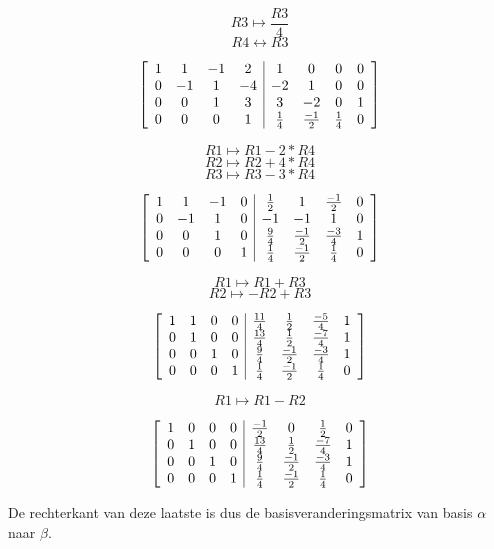 \documentclass[lineaire_algebra_oplossingen.tex]{subfiles}
\begin{document}
\[R3 \mapsto \frac{R3}{4} \]
\[R4 \leftrightarrow R3 \]

\[
\left[
\begin{array}{ c c c c | c c c c }
1 & 1 & -1 & 2 & 1 & 0 & 0 & 0\\
0 & -1 & 1 & -4 & -2 & 1 & 0 & 0\\
0 & 0 & 1 & 3 & 3 & -2 & 0 & 1\\
0 & 0 & 0 & 1 & \frac{1}{4} & \frac{-1}{2} & \frac{1}{4} & 0
\end{array}
\right]
\]

\[R1 \mapsto R1 - 2*R4 \]
\[R2 \mapsto R2 + 4*R4 \]
\[R3 \mapsto R3 - 3*R4 \]

\[
\left[
\begin{array}{ c c c c | c c c c }
1 & 1 & -1 & 0 & \frac{1}{2} & 1 & \frac{-1}{2} & 0\\
0 & -1 & 1 & 0 & -1 & -1 & 1 & 0\\
0 & 0 & 1 & 0 & \frac{9}{4} & \frac{-1}{2} & \frac{-3}{4} & 1\\
0 & 0 & 0 & 1 & \frac{1}{4} & \frac{-1}{2} & \frac{1}{4} & 0
\end{array}
\right]
\]

\[R1 \mapsto R1 + R3 \]
\[R2 \mapsto -R2 + R3 \]

\[
\left[
\begin{array}{ c c c c | c c c c }
1 & 1 & 0 & 0 & \frac{11}{4} & \frac{1}{2} & \frac{-5}{4} & 1\\
0 & 1 & 0 & 0 & \frac{13}{4} & \frac{1}{2} & \frac{-7}{4} & 1\\
0 & 0 & 1 & 0 & \frac{9}{4} & \frac{-1}{2} & \frac{-3}{4} & 1\\
0 & 0 & 0 & 1 & \frac{1}{4} & \frac{-1}{2} & \frac{1}{4} & 0
\end{array}
\right]
\]

\[R1 \mapsto R1 - R2 \]

\[
\left[
\begin{array}{ c c c c | c c c c }
1 & 0 & 0 & 0 & \frac{-1}{2} & 0 & \frac{1}{2} & 0\\
0 & 1 & 0 & 0 & \frac{13}{4} & \frac{1}{2} & \frac{-7}{4} & 1\\
0 & 0 & 1 & 0 & \frac{9}{4} & \frac{-1}{2} & \frac{-3}{4} & 1\\
0 & 0 & 0 & 1 & \frac{1}{4} & \frac{-1}{2} & \frac{1}{4} & 0
\end{array}
\right]
\]

De rechterkant van deze laatste is dus de basisveranderingsmatrix van basis $\alpha$ naar $\beta$.
\end{document}
